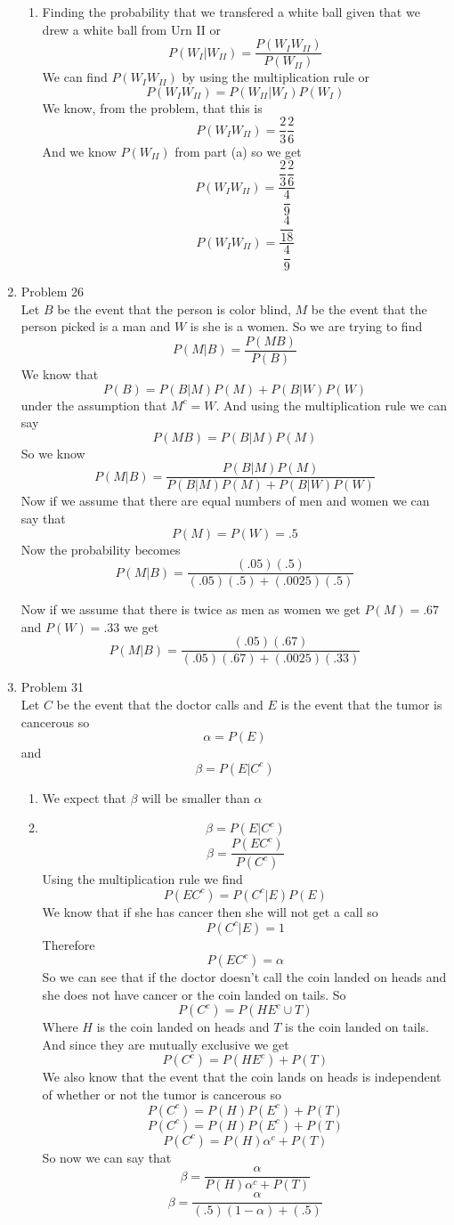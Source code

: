 \documentclass[11pt]{article}
\begin{document}
\begin{enumerate}
\begin{enumerate}
\item
Finding the probability that we transfered a white ball given that we drew a white ball from Urn II or 
$$P(W_I|W_{II}) = \frac{P(W_IW_{II})}{P(W_{II})}$$
We can find $P(W_IW_{II})$ by using the multiplication rule or
$$P(W_IW_{II}) = P(W_{II}|W_I)P(W_I)$$ 
We know, from the problem, that this is
$$P(W_IW_{II}) = \frac{2}{3}\frac{2}{6}$$
And we know $P(W_{II})$ from part (a) so we get
$$P(W_IW_{II}) = \frac{\dfrac{2}{3}\dfrac{2}{6}}{\dfrac{4}{9}}$$
$$P(W_IW_{II}) = \frac{\dfrac{4}{18}}{\dfrac{4}{9}}$$
\begin{center}
\end{center}
\end{enumerate}
\item Problem 26\\
Let $B$ be the event that the person is color blind, $M$ be the event that the person picked is a man and $W$ is she is a women. So we are trying to find 
$$P(M|B) = \frac{P(MB)}{P(B)}$$
We know that $$P(B) = P(B|M)P(M) + P(B|W)P(W)$$
under the assumption that $M^c = W$. And using the multiplication rule we can say
$$P(MB) = P(B|M)P(M)$$
So we know
$$P(M|B) = \frac{P(B|M)P(M)}{P(B|M)P(M) + P(B|W)P(W)}$$
Now if we assume that there are equal numbers of men and women we can say that
$$P(M)=P(W)=.5$$ 
Now the probability becomes
$$P(M|B) = \frac{(.05)(.5)}{(.05)(.5) + (.0025)(.5)}$$
\begin{center}
\end{center}
Now if we assume that there is twice as men as women we get $P(M) = .67$ and $P(W) = .33$ we get
$$P(M|B) = \frac{(.05)(.67)}{(.05)(.67) + (.0025)(.33)}$$
\begin{center}
\end{center}

\item Problem 31\\
Let $C$ be the event that the doctor calls and $E$ is the event that the tumor is cancerous so $$\alpha = P(E)$$ and $$\beta = P(E|C^c)$$ 
\begin{enumerate}
\item
We expect that $\beta$ will be smaller than $\alpha$
\item
$$\beta = P(E|C^c)$$
$$\beta = \frac{P(EC^c)}{P(C^c)}$$
Using the multiplication rule we find
$$P(EC^c) = P(C^c|E)P(E)$$
We know that if she has cancer then she will not get a call so
$$P(C^c|E)=1$$
Therefore
$$P(EC^c) = \alpha$$
So we can see that if the doctor doesn't call the coin landed on heads and she does not have cancer or the coin landed on tails. So
$$P(C^c) = P(HE^c \cup T)$$
Where $H$ is the coin landed on heads and $T$ is the coin landed on tails.
And since they are mutually exclusive we get
$$P(C^c) = P(HE^c)+P(T)$$
We also know that the event that the coin lands on heads is independent of  whether or not the tumor is cancerous so
$$P(C^c) = P(H)P(E^c)+P(T)$$
$$P(C^c) = P(H)P(E^c)+P(T)$$
$$P(C^c) = P(H)\alpha^c+P(T)$$
So now we can say that
$$\beta = \frac{\alpha}{P(H)\alpha^c+P(T)}$$
$$\beta = \frac{\alpha}{(.5)(1-\alpha)+(.5)}$$
\end{enumerate}

\end{enumerate}
\end{document}

